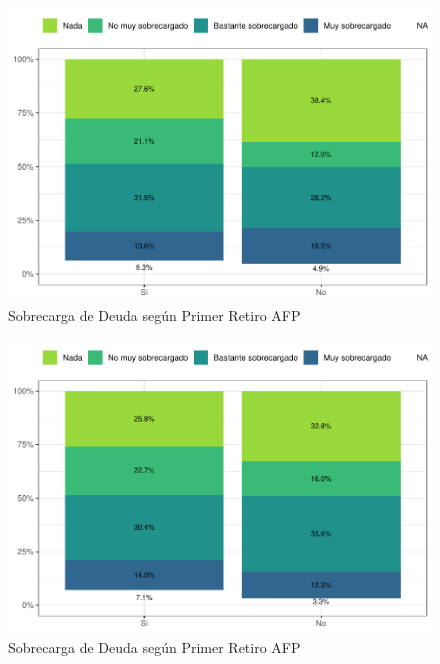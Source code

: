 \documentclass[
  12pt,
]{book}
\begin{document}
\begin{figure}

{\centering \includegraphics{reporte-elsoc_files/figure-latex/endeud-1retiro-1} 

}

\caption{Sobrecarga de Deuda según Primer Retiro AFP}\label{fig:endeud-1retiro}
\end{figure}

\begin{figure}

{\centering \includegraphics{reporte-elsoc_files/figure-latex/endeud-2retiro-1} 

}

\caption{Sobrecarga de Deuda según Primer Retiro AFP}\label{fig:endeud-2retiro}
\end{figure}
\end{document}

